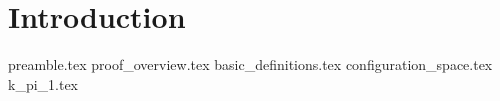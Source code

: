 \documentclass[class=article, crop=false]{standalone}
\begin{document}
\chapter{Introduction}
{preamble.tex}
{proof_overview.tex}
{basic_definitions.tex}
{configuration_space.tex}
{k_pi_1.tex}
\end{document}
